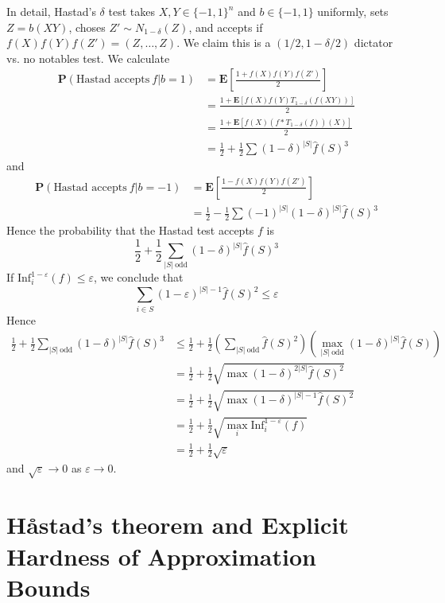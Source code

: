 In detail, Hastad's $\delta$ test takes $X,Y \in \{ -1, 1 \}^n$ and $b \in \{ -1, 1 \}$ uniformly, sets $Z = b(XY)$, choses $Z' \sim N_{1 - \delta}(Z)$, and accepts if $f(X)f(Y)f(Z') = (Z,\dots,Z)$. We claim this is a $(1/2, 1 - \delta/2)$ dictator vs. no notables test. We calculate
%
\begin{align*}
    \mathbf{P}(\text{Hastad accepts}\ f | b = 1) &= \mathbf{E} \left[ \frac{1 + f(X)f(Y)f(Z')}{2} \right]\\
    &= \frac{1 + \mathbf{E}[f(X)f(Y) T_{1-\delta}(f(XY))]}{2}\\
    &= \frac{1 + \mathbf{E}[f(X) (f * T_{1 - \delta}(f))(X)]}{2}\\
    &= \frac{1}{2} + \frac{1}{2} \sum (1 - \delta)^{|S|} \widehat{f}(S)^3
\end{align*}
%
and
%
\begin{align*}
    \mathbf{P}(\text{Hastad accepts}\ f | b = -1) &= \mathbf{E} \left[ \frac{1 - f(X)f(Y)f(Z')}{2} \right]\\
    &= \frac{1}{2} - \frac{1}{2} \sum (-1)^{|S|} (1 - \delta)^{|S|} \widehat{f}(S)^3
\end{align*}
%
Hence the probability that the Hastad test accepts $f$ is
%
\[ \frac{1}{2} + \frac{1}{2} \sum_{|S|\ \text{odd}} (1 - \delta)^{|S|} \widehat{f}(S)^3 \]
%
If $\text{Inf}^{1-\varepsilon}_i(f) \leq \varepsilon$, we conclude that
%
\[ \sum_{i \in S} (1 - \varepsilon)^{|S|-1} \widehat{f}(S)^2 \leq \varepsilon \]
%
Hence
%
\begin{align*}
    \frac{1}{2} + \frac{1}{2} \sum_{|S|\ \text{odd}} (1 - \delta)^{|S|} \widehat{f}(S)^3 &\leq \frac{1}{2} + \frac{1}{2} \left( \sum_{|S|\ \text{odd}} \widehat{f}(S)^2 \right) \left( \max_{|S|\ \text{odd}} (1 - \delta)^{|S|} \widehat{f}(S) \right)\\
    &= \frac{1}{2} + \frac{1}{2} \sqrt{ \max (1 - \delta)^{2|S|} \widehat{f}(S)^2 }\\
    &= \frac{1}{2} + \frac{1}{2} \sqrt{ \max (1 - \delta)^{|S| - 1} \widehat{f}(S)^2 }\\
    &= \frac{1}{2} + \frac{1}{2} \sqrt{ \max_i \text{Inf}_i^{1 - \varepsilon}(f) }\\
    &= \frac{1}{2} + \frac{1}{2} \sqrt{\varepsilon}
\end{align*}
%
and $\sqrt{\varepsilon} \to 0$ as $\varepsilon \to 0$.

\section{Håstad's theorem and Explicit Hardness of Approximation Bounds}

